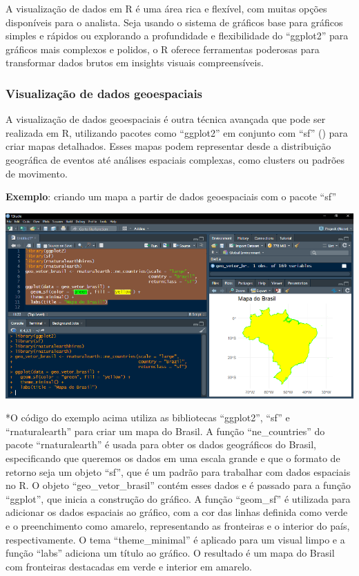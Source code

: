 \documentclass[
]{book}
\begin{document}
A visualização de dados em R é uma área rica e flexível, com muitas opções disponíveis para o analista. Seja usando o sistema de gráficos base para gráficos simples e rápidos ou explorando a profundidade e flexibilidade do ``ggplot2'' para gráficos mais complexos e polidos, o R oferece ferramentas poderosas para transformar dados brutos em insights visuais compreensíveis.

\subsubsection{Visualização de dados geoespaciais}\label{visualizauxe7uxe3o-de-dados-geoespaciais}

A visualização de dados geoespaciais é outra técnica avançada que pode ser realizada em R, utilizando pacotes como ``ggplot2'' em conjunto com ``sf'' () para criar mapas detalhados. Esses mapas podem representar desde a distribuição geográfica de eventos até análises espaciais complexas, como clusters ou padrões de movimento.

\textbf{Exemplo}: criando um mapa a partir de dados geoespaciais com o pacote ``sf''

\includegraphics{images/clipboard-3449562011.png}

*O código do exemplo acima utiliza as bibliotecas ``ggplot2'', ``sf'' e ``rnaturalearth'' para criar um mapa do Brasil. A função ``ne\_countries'' do pacote ``rnaturalearth'' é usada para obter os dados geográficos do Brasil, especificando que queremos os dados em uma escala grande e que o formato de retorno seja um objeto ``sf'', que é um padrão para trabalhar com dados espaciais no R. O objeto ``geo\_vetor\_brasil'' contém esses dados e é passado para a função ``ggplot'', que inicia a construção do gráfico. A função ``geom\_sf'' é utilizada para adicionar os dados espaciais ao gráfico, com a cor das linhas definida como verde e o preenchimento como amarelo, representando as fronteiras e o interior do país, respectivamente. O tema ``theme\_minimal'' é aplicado para um visual limpo e a função ``labs'' adiciona um título ao gráfico. O resultado é um mapa do Brasil com fronteiras destacadas em verde e interior em amarelo.
\end{document}

